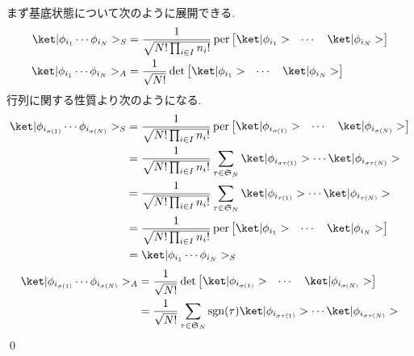 \documentclass[uplatex,dvipdfmx,a4paper,11pt]{jlreq}
\makeatletter
\DeclareMathOperator{\sgn}{sgn}
\DeclareMathOperator{\per}{per}
\renewcommand{\SS}{\mathfrak{S}}
\numberwithin{equation}{section}
\theoremstyle{definition}
\renewenvironment{proof}[1][\proofname]{\par
  \normalfont
  \topsep6\p@\@plus6\p@ \trivlist
  \item[\hskip\labelsep{\bfseries #1}\@addpunct{\bfseries}]\ignorespaces\quad\par
}{%
  \qed\endtrivlist\@endpefalse
}
\renewcommand\proofname{証明}
\makeatother
\begin{document}
\begin{proof}
  まず基底状態について次のように展開できる.
  \begin{align}
    \ket|\phi_{i_1}\cdots\phi_{i_N}>_S & = \frac{1}{\sqrt{N!\prod_{i\in I}n_i!}}\per\begin{bmatrix}\ket|\phi_{i_1}> & \cdots & \ket|\phi_{i_N}>\end{bmatrix} \\
    \ket|\phi_{i_1}\cdots\phi_{i_N}>_A & = \frac{1}{\sqrt{N!}}\det\begin{bmatrix}\ket|\phi_{i_1}> & \cdots & \ket|\phi_{i_N}>\end{bmatrix}
  \end{align}
  行列に関する性質より次のようになる.
  \begin{align}
    \ket|\phi_{i_{\sigma(1)}}\cdots\phi_{i_{\sigma(N)}}>_S & = \frac{1}{\sqrt{N!\prod_{i\in I}n_i!}}\per\begin{bmatrix}\ket|\phi_{i_{\sigma(1)}}> & \cdots & \ket|\phi_{i_{\sigma(N)}}>\end{bmatrix} \\
                                                           & = \frac{1}{\sqrt{N!\prod_{i\in I}n_i!}}\sum_{\tau\in\SS_N}\ket|\phi_{i_{\sigma\tau(1)}}>\cdots\ket|\phi_{i_{\sigma\tau(N)}}>                                              \\
                                                           & = \frac{1}{\sqrt{N!\prod_{i\in I}n_i!}}\sum_{\tau\in\SS_N}\ket|\phi_{i_{\tau(1)}}>\cdots\ket|\phi_{i_{\tau(N)}}>                                                          \\
                                                           & = \frac{1}{\sqrt{N!\prod_{i\in I}n_i!}}\per\begin{bmatrix}\ket|\phi_{i_1}> & \cdots & \ket|\phi_{i_N}>\end{bmatrix}                                                       \\
                                                           & = \ket|\phi_{i_1}\cdots\phi_{i_N}>_S
  \end{align}
  \begin{align}
    \ket|\phi_{i_{\sigma(1)}}\cdots\phi_{i_{\sigma(N)}}>_A & = \frac{1}{\sqrt{N!}}\det\begin{bmatrix}\ket|\phi_{i_{\sigma(1)}}> & \cdots & \ket|\phi_{i_{\sigma(N)}}>\end{bmatrix} \\
                                                           & = \frac{1}{\sqrt{N!}}\sum_{\tau\in\SS_N}\sgn(\tau)\ket|\phi_{i_{\sigma\tau(1)}}>\cdots\ket|\phi_{i_{\sigma\tau(N)}}>                                    \\

\end{align}
\end{proof}
\end{document}
